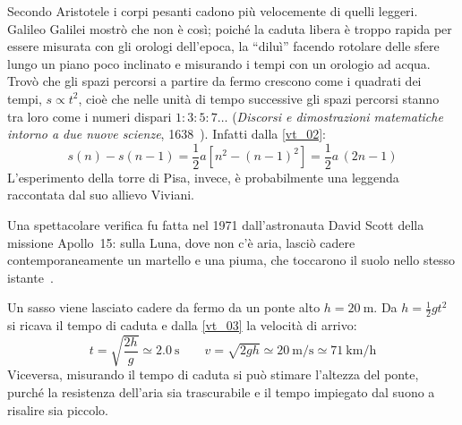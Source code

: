 \begin{Es}
  Secondo Aristotele i corpi pesanti cadono più velocemente di quelli leggeri. Galileo Galilei mostrò che non è così; poiché la caduta libera è troppo rapida per essere misurata con gli orologi dell'epoca, la ``diluì'' facendo rotolare delle sfere lungo un piano poco inclinato e misurando i tempi con un orologio ad acqua. Trovò che gli spazi percorsi a partire da fermo crescono come i quadrati dei tempi, $s\propto t^2$, cioè che nelle unità di tempo successive gli spazi percorsi stanno tra loro come i numeri dispari $1:3:5:7\ldots$ (\emph{Discorsi e dimostrazioni matematiche intorno a due nuove scienze}, 1638~\cite{galileo1638}). Infatti dalla \eqref{vt_02}:
  \[
    s(n)-s(n-1)=\frac{1}{2}a\left[n^2-(n-1)^2\right]=\frac{1}{2}a\,(2n-1)
  \]
  L'esperimento della torre di Pisa, invece, è probabilmente una leggenda raccontata dal suo allievo Viviani.

  Una spettacolare verifica fu fatta nel 1971 dall'astronauta David Scott della missione Apollo~15: sulla Luna, dove non c'è aria, lasciò cadere contemporaneamente un martello e una piuma, che toccarono il suolo nello stesso istante~\cite{apollo15}.
\end{Es}

\begin{Es}
  Un sasso viene lasciato cadere da fermo da un ponte alto $h=\SI{20}{\meter}$. Da $h=\frac{1}{2}gt^2$ si ricava il tempo di caduta e dalla \eqref{vt_03} la velocità di arrivo:
  \[
    t=\sqrt{\frac{2h}{g}}\simeq\SI{2.0}{\second}\qquad v=\sqrt{2gh}\simeq\SI{20}{\meter\per\second}\simeq\SI{71}{\kilo\meter\per\hour}
  \]
  Viceversa, misurando il tempo di caduta si può stimare l'altezza del ponte, purché la resistenza dell'aria sia trascurabile e il tempo impiegato dal suono a risalire sia piccolo.
\end{Es}

